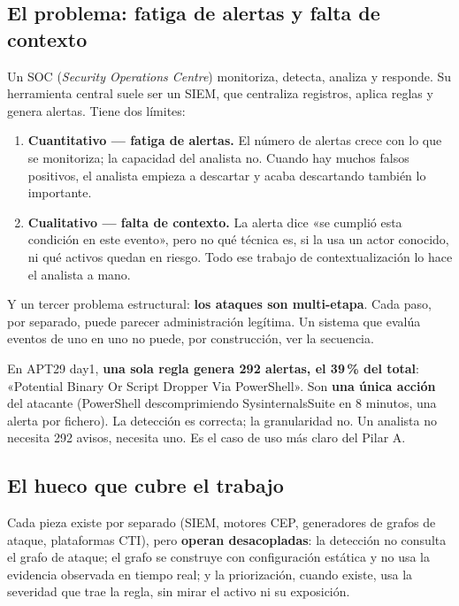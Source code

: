 \documentclass[11pt,a4paper]{article}
\begin{document}
\subsection{El problema: fatiga de alertas y falta de contexto}

Un SOC (\textit{Security Operations Centre}) monitoriza, detecta, analiza y responde. Su herramienta
central suele ser un SIEM, que centraliza registros, aplica reglas y genera alertas. Tiene dos límites:

\begin{enumerate}
  \item \textbf{Cuantitativo — fatiga de alertas.} El número de alertas crece con lo que se monitoriza;
        la capacidad del analista no. Cuando hay muchos falsos positivos, el analista empieza a descartar
        y acaba descartando también lo importante.
  \item \textbf{Cualitativo — falta de contexto.} La alerta dice «se cumplió esta condición en este
        evento», pero no qué técnica es, si la usa un actor conocido, ni qué activos quedan en riesgo.
        Todo ese trabajo de contextualización lo hace el analista a mano.
\end{enumerate}

Y un tercer problema estructural: \textbf{los ataques son multi-etapa}. Cada paso, por separado, puede
parecer administración legítima. Un sistema que evalúa eventos de uno en uno no puede, por construcción,
ver la secuencia.

\begin{dato}
En APT29 day1, \textbf{una sola regla genera 292 alertas, el 39\,\% del total}: «Potential Binary Or
Script Dropper Via PowerShell». Son \textbf{una única acción} del atacante (PowerShell descomprimiendo
SysinternalsSuite en 8 minutos, una alerta por fichero). La detección es correcta; la granularidad no.
Un analista no necesita 292 avisos, necesita uno. Es el caso de uso más claro del Pilar A.
\end{dato}

\subsection{El hueco que cubre el trabajo}

Cada pieza existe por separado (SIEM, motores CEP, generadores de grafos de ataque, plataformas CTI),
pero \textbf{operan desacopladas}: la detección no consulta el grafo de ataque; el grafo se construye con
configuración estática y no usa la evidencia observada en tiempo real; y la priorización, cuando existe,
usa la severidad que trae la regla, sin mirar el activo ni su exposición.
\end{document}
